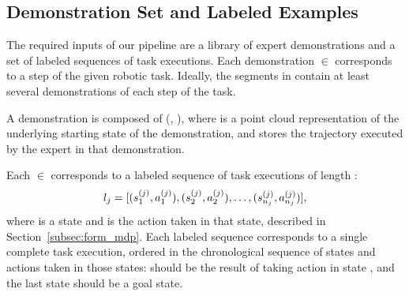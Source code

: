 \subsection{Demonstration Set and Labeled Examples}

The required inputs of our pipeline are a library \demoset{}
of expert demonstrations and a set  of labeled sequences of
task executions.
Each demonstration \demovar{} $\in$ \demoset{} corresponds to a step
of the given robotic task. Ideally, the segments in \demoset{} contain
at least several demonstrations of each step of the task.

A demonstration \demovar{} is composed of (, ),
where  is a point cloud representation of the underlying
starting state of the demonstration, and  stores
the trajectory executed by the expert in that demonstration.

Each  $\in$ 
corresponds to a labeled sequence of
task executions of length :
\begin{equation*}
l_{j} = [(s_{1}^{(j)}, a_{1}^{(j)}),
(s_{2}^{(j)}, a_{2}^{(j)}), \ldots, (s_{n_{j}}^{(j)}, a_{n_{j}}^{(j)})],
\end{equation*}
where 
is a state and  is the action taken in that state, described in
Section~\ref{subsec:form_mdp}. Each labeled sequence  corresponds
to a single complete task execution, ordered in the chronological sequence of
states and actions taken in those states:  should
be the result of taking action  in state ,
and the last state  should be a goal state.


